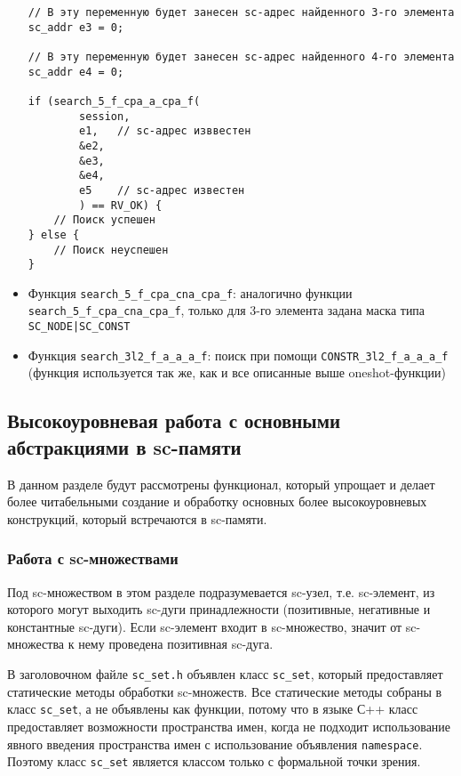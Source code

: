 \begin{itemize}
\begin{lstlisting}[texcl]
// В эту переменную будет занесен sc-адрес найденного 3-го элемента
sc_addr e3 = 0;

// В эту переменную будет занесен sc-адрес найденного 4-го элемента
sc_addr e4 = 0;

if (search_5_f_cpa_a_cpa_f(
        session,
        e1,   // sc-адрес изввестен
        &e2,
        &e3,
        &e4,
        e5    // sc-адрес известен
        ) == RV_OK) {
    // Поиск успешен
} else {
    // Поиск неуспешен
}
\end{lstlisting}

\item Функция \lstinline|search_5_f_cpa_сna_cpa_f|: аналогично функции
  \lstinline|search_5_f_cpa_сna_cpa_f|, только для 3-го элемента
  задана маска типа \lstinline+SC_NODE|SC_CONST+

\item Функция \lstinline|search_3l2_f_a_a_a_f|: поиск при помощи
  \lstinline|CONSTR_3l2_f_a_a_a_f| (функция используется так же, как и
  все описанные выше oneshot-функции)
\end{itemize}

\subsection{Высокоуровневая работа с основными абстракциями в sc-памяти}
\label{sec:libsc_high}

В данном разделе будут рассмотрены функционал, который упрощает и
делает более читабельными создание и обработку основных более
высокоуровневых конструкций, который встречаются в sc-памяти.

\subsubsection{Работа с sc-множествами}
\label{sec:libsc_sc_set}

Под sc-множеством в этом разделе подразумевается sc-узел,
т.е. sc-элемент, из которого могут выходить sc-дуги принадлежности
(позитивные, негативные и константные sc-дуги). Если sc-элемент входит
в sc-множество, значит от sc-множества к нему проведена позитивная
sc-дуга.

В заголовочном файле \verb|sc_set.h| объявлен класс
\lstinline|sc_set|, который предоставляет статические методы обработки
sc-множеств. Все статические методы собраны в класс
\lstinline|sc_set|, а не объявлены как функции, потому что в языке С++
класс предоставляет возможности пространства имен, когда не подходит
использование явного введения пространства имен с использование
объявления \lstinline|namespace|. Поэтому класс \lstinline|sc_set|
является классом только с формальной точки зрения.

